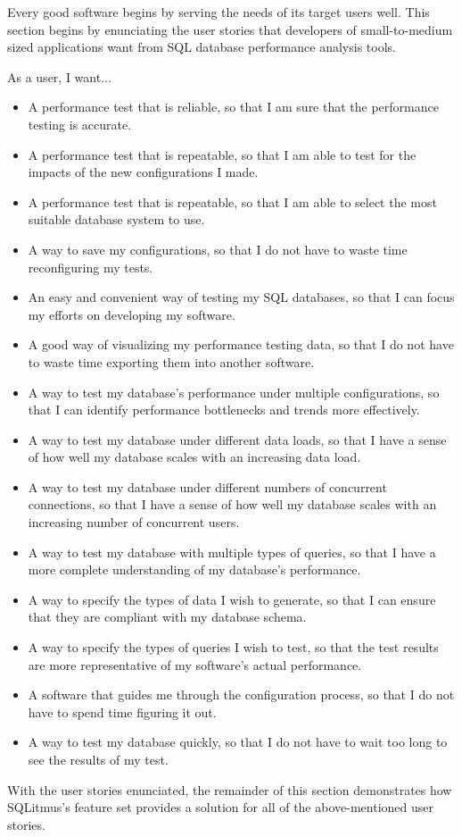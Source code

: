 \documentclass[12pt]{report}
\begin{document}
\begin{spacing}{1.9}
		Every good software begins by serving the needs of its target users well. This section begins by enunciating the user stories that developers of small-to-medium sized applications want from SQL database performance analysis tools. 
		
		As a user, I want...
		\begin{itemize}
			
			\item A performance test that is reliable, so that I am sure that the performance testing is accurate.
			\item A performance test that is repeatable, so that I am able to test for the impacts of the new configurations I made.
			\item A performance test that is repeatable, so that I am able to select the most suitable database system to use.
			\item A way to save my configurations, so that I do not have to waste time reconfiguring my tests.
			\item An easy and convenient way of testing my SQL databases, so that I can focus my efforts on developing my software.
			\item A good way of visualizing my performance testing data, so that I do not have to waste time exporting them into another software.
			\item A way to test my database's performance under multiple configurations, so that I can identify performance bottlenecks and trends more effectively. 
			\item A way to test my database under different data loads, so that I have a sense of how well my database scales with an increasing data load.
			\item A way to test my database under different numbers of concurrent connections, so that I have a sense of how well my database scales with an increasing number of concurrent users.
			\item A way to test my database with multiple types of queries, so that I have a more complete understanding of my database's performance.
			\item A way to specify the types of data I wish to generate, so that I can ensure that they are compliant with my database schema.
			\item A way to specify the types of queries I wish to test, so that the test results are more representative of my software's actual performance.
			\item A software that guides me through the configuration process, so that I do not have to spend time figuring it out.
			\item A way to test my database quickly, so that I do not have to wait too long to see the results of my test.
		\end{itemize}
		With the user stories enunciated, the remainder of this section demonstrates how SQLitmus's feature set provides a solution for all of the above-mentioned user stories.
		

\end{spacing}
\end{document}
